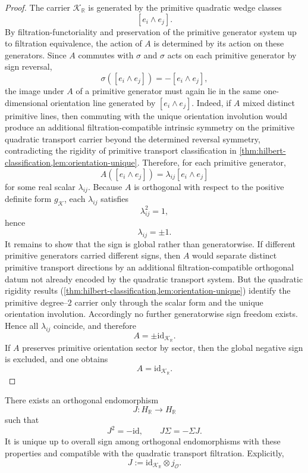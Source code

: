 \begin{proof}
	The carrier \(\mathcal K_{\mathbb R}\) is generated by the primitive
	quadratic wedge classes
	\[
		[e_i\wedge e_j].
	\]
	By filtration-functoriality and preservation of the primitive generator
	system up to filtration equivalence, the action of \(A\) is determined
	by its action on these generators.
	Since \(A\) commutes with \(\sigma\) and \(\sigma\) acts on each
	primitive generator by sign reversal,
	\[
		\sigma([e_i\wedge e_j])=-[e_i\wedge e_j],
	\]
	the image under \(A\) of a primitive generator must again lie in the
	same one-dimensional orientation line generated by
	\([e_i\wedge e_j]\).
	Indeed, if \(A\) mixed distinct primitive lines, then commuting with the
	unique orientation involution would produce an additional
	filtration-compatible intrinsic symmetry on the primitive quadratic
	transport carrier beyond the determined reversal symmetry, contradicting the
	rigidity of primitive transport classification in
	\cref{thm:hilbert-classification,lem:orientation-unique}.
	Therefore, for each primitive generator,
	\[
		A([e_i\wedge e_j])=\lambda_{ij}[e_i\wedge e_j]
	\]
	for some real scalar \(\lambda_{ij}\).
	Because \(A\) is orthogonal with respect to the positive definite form
	\(g_{\mathcal K}\), each \(\lambda_{ij}\) satisfies
	\[
		\lambda_{ij}^{2}=1,
	\]
	hence
	\[
		\lambda_{ij}=\pm 1.
	\]
	It remains to show that the sign is global rather than generatorwise.
	If different primitive generators carried different signs, then \(A\)
	would separate distinct primitive transport directions by an additional
	filtration-compatible orthogonal datum not already encoded by the
	quadratic transport system.
	But the quadratic rigidity results
	(\cref{thm:hilbert-classification,lem:orientation-unique}) identify the primitive
	degree--\(2\) carrier only through the scalar form and the unique
	orientation involution.
	Accordingly no further generatorwise sign freedom exists.
	Hence all \(\lambda_{ij}\) coincide, and therefore
	\[
		A=\pm \mathrm{id}_{\mathcal K_{\mathbb R}}.
	\]
	If \(A\) preserves primitive orientation sector by sector, then the
	global negative sign is excluded, and one obtains
	\[
		A=\mathrm{id}_{\mathcal K_{\mathbb R}}.
	\]
\end{proof}
\begin{theorem}
	\label{thm:universal-complex-structure}
	There exists an orthogonal endomorphism
	\[
		J:H_{\mathbb R}\to H_{\mathbb R}
	\]
	such that
	\[
		J^{2}=-\mathrm{id},
		\qquad
		J\Sigma=-\Sigma J.
	\]
	It is unique up to overall sign among orthogonal endomorphisms with
	these properties and compatible with the quadratic transport
	filtration.
	Explicitly,
	\[
		J:=\mathrm{id}_{\mathcal K_{\mathbb R}}\otimes j_{\mathcal O}.
	\]
\end{theorem}
